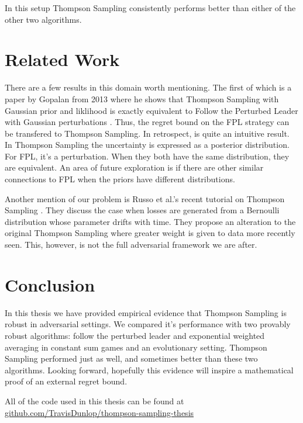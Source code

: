 \documentclass[10pt,a4paper]{article} %
\begin{document}
	In this setup Thompson Sampling consistently performs better than either of the other two algorithms.

	\section{Related Work}
	
	There are a few results in this domain worth mentioning.  The first of which is a paper by Gopalan from 2013 where he shows that Thompson Sampling with Gaussian prior and liklihood is exactly equivalent to Follow the Perturbed Leader with Gaussian perturbations \cite{FPL_TS_Gaussian}.  Thus, the regret bound on the FPL strategy can be transfered to Thompson Sampling.  In retrospect, is quite an intuitive result.  In Thompson Sampling the uncertainty is expressed as a posterior distribution. For FPL, it's a perturbation.  When they both have the same distribution, they are equivalent. 	An area of future exploration is if there are other similar connections to FPL when the priors have different distributions.
	
	Another mention of our problem is Russo et al.'s recent tutorial on Thompson Sampling \cite{Russo_TS}.  They discuss the case when losses are generated from a Bernoulli distribution whose parameter drifts with time.  They propose an alteration to the original Thompson Sampling where greater weight is given to data more recently seen.  This, however, is not the full adversarial framework we are after.

	\section{Conclusion}
	
	In this thesis we have provided empirical evidence that Thompson Sampling is robust in adversarial settings.  We compared it's performance with two provably robust algorithms: follow the perturbed leader and exponential weighted averaging in constant sum games and an evolutionary setting.  Thompson Sampling performed just as well, and sometimes better than these two algorithms.  Looking forward, hopefully this evidence will inspire a mathematical proof of an external regret bound.
	
	All of the code used in this thesis can be found at \url{github.com/TravisDunlop/thompson-sampling-thesis}
	
	
	\nocite{*}
	
	
\end{document}

